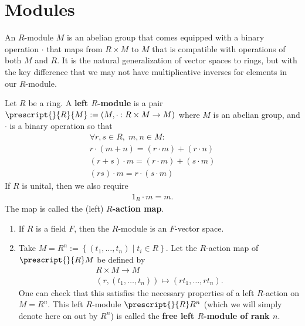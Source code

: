\documentclass{memoir}
\begin{document}


\section{Modules}
\label{sec:modules}

An \(R\)-module \(M\) is an abelian group that comes equipped with a binary operation \(\cdot \) that maps from \(R\times M\) to \(M\) that is compatible with operations of both \(M\) and \(R\). It is the natural generalization of vector spaces to rings, but with the key difference that we may not have multiplicative inverses for elements in our \(R\)-module.

\begin{defn}
Let \(R\) be a ring. A \textbf{left \(R\)-module} is a pair \(\prescript{}{R}{M} := (M,\cdot :R\times M\to M)\) where \(M\) is an abelian group, and \(\cdot \) is a binary operation so that
	\begin{align*}
		\forall r,s \in R, \; m,n \in M:\\
		r\cdot (m+n) = (r\cdot m) + (r\cdot n)\\
		(r+s)\cdot m = (r\cdot m) + (s\cdot m)\\
		(rs)\cdot m = r\cdot(s\cdot m)
	\end{align*}
	If \(R\) is unital, then we also require
	\begin{align*}
		1_R \cdot  m = m.
	\end{align*}
	The map is called the (left) \textbf{\(R\)-action map}.
\end{defn}

\begin{exmp}
	\begin{enumerate}
		\item If \(R\) is a field \(F\), then the \(R\)-module is an \(F\)-vector space.
		\item Take \(M = R^{n} := \left\{(t_1,\ldots,t_n) \mid t_i \in R \right\}\). Let the \(R\)-action map of \(\prescript{}{R}M\) be defined by
			\begin{align*}
				R\times M \to M\\
				(r,(t_1,\ldots,t_n)) \mapsto (rt_1,\ldots,rt_n).
			\end{align*}
			One can check that this satisfies the necessary properties of a left \(R\)-action on \(M = R^{n}\). This left \(R\)-module \(\prescript{}{R}R^{n}\) (which we will simply denote here on out by \(R^{n}\)) is called the \textbf{free left \(R\)-module of rank \(n\)}.
	\end{enumerate}
\end{exmp}
\end{document}
